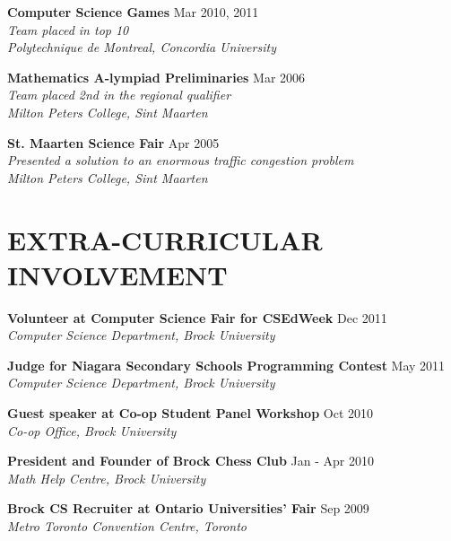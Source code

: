 \documentclass[margin]{res}
\begin{document}
\begin{resume}
  \textbf{Computer Science Games} \hfill Mar 2010, 2011 \\
    {\sl Team placed in top 10} \\
    {\sl Polytechnique de Montreal, Concordia University}


  \textbf{Mathematics A-lympiad Preliminaries} \hfill Mar 2006 \\
    {\sl Team placed 2nd in the regional qualifier} \\
    {\sl Milton Peters College, Sint Maarten}

  \textbf{St. Maarten Science Fair} \hfill Apr 2005 \\
    {\sl Presented a solution to an enormous traffic congestion problem} \\
    {\sl Milton Peters College, Sint Maarten}


\section{EXTRA-CURRICULAR \\ INVOLVEMENT}

  \textbf{Volunteer at Computer Science Fair for CSEdWeek} \hfill Dec 2011 \\
    {\sl Computer Science Department, Brock University}

  \textbf{Judge for Niagara Secondary Schools Programming Contest} \hfill May 2011 \\
    {\sl Computer Science Department, Brock University}

  \textbf{Guest speaker at Co-op Student Panel Workshop} \hfill Oct 2010 \\
    {\sl Co-op Office, Brock University}

  \textbf{President and Founder of Brock Chess Club} \hfill Jan - Apr 2010 \\
    {\sl Math Help Centre, Brock University}

  \textbf{Brock CS Recruiter at Ontario Universities' Fair} \hfill Sep 2009 \\
    {\sl Metro Toronto Convention Centre, Toronto}


\end{resume}
\end{document}
